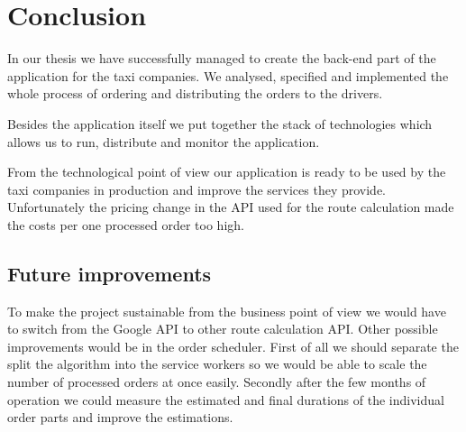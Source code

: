 \chapter*{Conclusion}
In our thesis we have successfully managed to create the back-end part of the application for the taxi companies. We analysed, specified and implemented the whole process of ordering and distributing the orders to the drivers. 

Besides the application itself we put together the stack of technologies which allows us to run, distribute and monitor the application.

From the technological point of view our application is ready to be used by the taxi companies in production and improve the services they provide. Unfortunately the pricing change in the API used for the route calculation made the costs per one processed order too high.

\section{Future improvements}
To make the project sustainable from the business point of view we would have to switch from the Google API to other route calculation API. Other possible improvements would be in the order scheduler. First of all we should separate the split the algorithm into the service workers so we would be able to scale the number of processed orders at once easily. Secondly after the few months of operation we could measure the estimated and final durations of the individual order parts and improve the estimations.